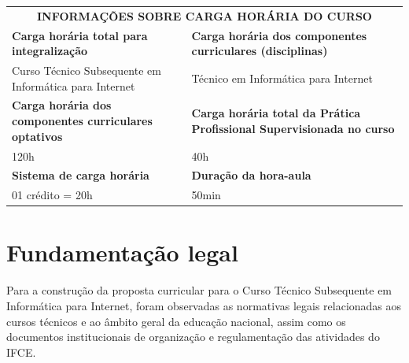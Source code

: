 \documentclass[
	12pt,				%
	openright,			%
	twoside,			%
	a4paper,			%
	chapter=TITLE,		%
	english,			%
	french,				%
	spanish,			%
	brazil,				%
	]{abntex2}
\begin{document}
\noindent
\begin{tabularx}{\linewidth}{X X}
	\multicolumn{2}{c}{\cellcolor{gray!40}\textbf{INFORMAÇÕES SOBRE CARGA HORÁRIA DO CURSO}} \\
	
	\cellcolor{gray!10}\textbf{Carga horária total para integralização} &
	\cellcolor{gray!10}\textbf{Carga horária dos componentes \newline curriculares (disciplinas)} \\
	
	Curso Técnico Subsequente em Informática para Internet & Técnico em Informática para Internet\\
	
	\cellcolor{gray!10}\textbf{Carga horária dos componentes \newline  curriculares optativos} &
	\cellcolor{gray!10}\textbf{Carga horária total da Prática  \newline  Profissional Supervisionada no curso} \\
	120h & 40h\\
	
	\cellcolor{gray!10}\textbf{Sistema de carga horária} &
	\cellcolor{gray!10}\textbf{Duração da hora-aula} \\
	01 crédito = 20h & 50min\\
	 
\end{tabularx}



\pagestyle{abntheadings}


\textual


\normalsize


	

\chapter{Fundamentação legal}
Para a construção da proposta curricular para o Curso Técnico Subsequente em Informática para Internet, foram observadas as normativas legais relacionadas aos cursos técnicos e ao âmbito geral da educação nacional, assim como os documentos institucionais de organização e regulamentação das atividades do IFCE.
\end{document}
